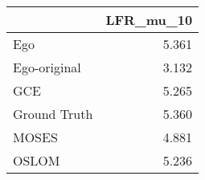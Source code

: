 \begin{tabular}{lr}
\toprule
{} & LFR_mu_10 \\
\midrule
Ego          &     5.361 \\
Ego-original &     3.132 \\
GCE          &     5.265 \\
Ground Truth &     5.360 \\
MOSES        &     4.881 \\
OSLOM        &     5.236 \\
\bottomrule
\end{tabular}
